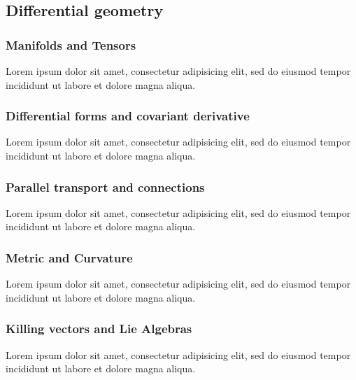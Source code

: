 
\subsection{Differential geometry}
\begin{frame}
\frametitle{Manifolds and Tensors}
Lorem ipsum dolor sit amet, consectetur adipisicing elit, sed do eiusmod tempor incididunt ut labore et dolore magna aliqua.
\end{frame}

\begin{frame}
\frametitle{Differential forms and covariant derivative}
Lorem ipsum dolor sit amet, consectetur adipisicing elit, sed do eiusmod tempor incididunt ut labore et dolore magna aliqua.
\end{frame}

\begin{frame}
\frametitle{Parallel transport and connections}
Lorem ipsum dolor sit amet, consectetur adipisicing elit, sed do eiusmod tempor incididunt ut labore et dolore magna aliqua.
\end{frame}

\begin{frame}
\frametitle{Metric and Curvature}
Lorem ipsum dolor sit amet, consectetur adipisicing elit, sed do eiusmod tempor incididunt ut labore et dolore magna aliqua.
\end{frame}

\begin{frame}
\frametitle{Killing vectors and Lie Algebras}
Lorem ipsum dolor sit amet, consectetur adipisicing elit, sed do eiusmod tempor incididunt ut labore et dolore magna aliqua.
\end{frame}
